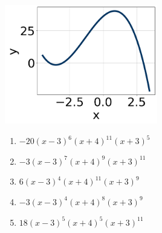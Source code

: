 \documentclass[14pt]{extbook}
\begin{document}
\begin{enumerate}
{\begin{center}
    \includegraphics[width=0.5\textwidth]{../Figures/polyGraphToFunctionB.png}
\end{center}
\begin{enumerate}[label=\Alph*.]
\item \( -20(x - 3)^{6} (x + 4)^{11} (x + 3)^{5} \)
\item \( -3(x - 3)^{7} (x + 4)^{9} (x + 3)^{11} \)
\item \( 6(x - 3)^{4} (x + 4)^{11} (x + 3)^{9} \)
\item \( -3(x - 3)^{4} (x + 4)^{8} (x + 3)^{9} \)
\item \( 18(x - 3)^{5} (x + 4)^{5} (x + 3)^{11} \)


\end{enumerate}}
\end{enumerate}
\end{document}
